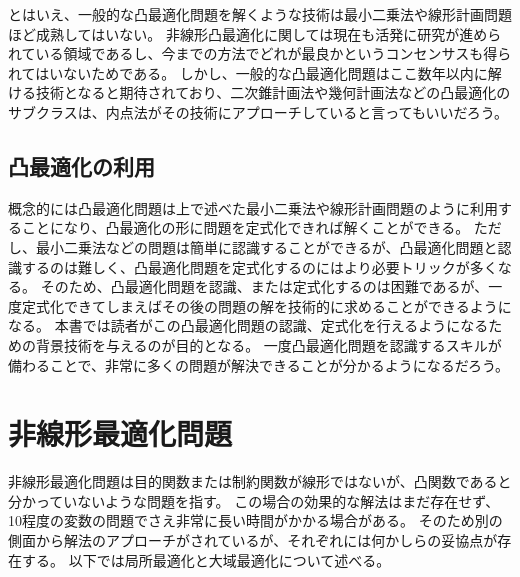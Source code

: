 \documentclass[a4paper, 10pt, uplatex]{jsreport}
\begin{document}
とはいえ、一般的な凸最適化問題を解くような技術は最小二乗法や線形計画問題ほど成熟してはいない。
非線形凸最適化に関しては現在も活発に研究が進められている領域であるし、今までの方法でどれが最良かというコンセンサスも得られてはいないためである。
しかし、一般的な凸最適化問題はここ数年以内に解ける技術となると期待されており、二次錐計画法や幾何計画法などの凸最適化のサブクラスは、内点法がその技術にアプローチしていると言ってもいいだろう。

\subsection{凸最適化の利用}
概念的には凸最適化問題は上で述べた最小二乗法や線形計画問題のように利用することになり、凸最適化の形に問題を定式化できれば解くことができる。
ただし、最小二乗法などの問題は簡単に認識することができるが、凸最適化問題と認識するのは難しく、凸最適化問題を定式化するのにはより必要トリックが多くなる。
そのため、凸最適化問題を認識、または定式化するのは困難であるが、一度定式化できてしまえばその後の問題の解を技術的に求めることができるようになる。
本書では読者がこの凸最適化問題の認識、定式化を行えるようになるための背景技術を与えるのが目的となる。
一度凸最適化問題を認識するスキルが備わることで、非常に多くの問題が解決できることが分かるようになるだろう。

\section{非線形最適化問題}
非線形最適化問題は目的関数または制約関数が線形ではないが、凸関数であると分かっていないような問題を指す。
この場合の効果的な解法はまだ存在せず、10程度の変数の問題でさえ非常に長い時間がかかる場合がある。
そのため別の側面から解法のアプローチがされているが、それぞれには何かしらの妥協点が存在する。
以下では局所最適化と大域最適化について述べる。
\end{document}
